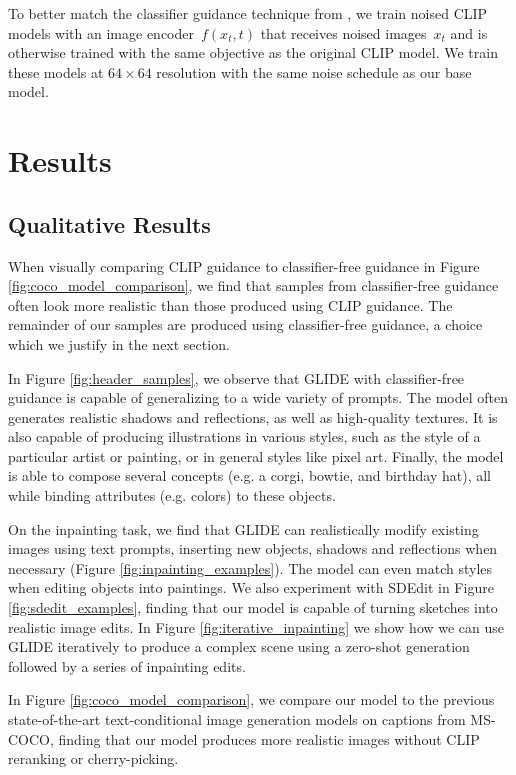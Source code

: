 \documentclass{article}
\newcommand{\modelname}{GLIDE}
\begin{document}
To better match the classifier guidance technique from \citet{sotapaper}, we train noised CLIP models with an image encoder~$f(x_t, t)$ that receives noised images~$x_t$ and is otherwise trained with the same objective as the original CLIP model. We train these models at $64 \times 64$ resolution with the same noise schedule as our base model.


\section{Results}
\label{sec:results}

\subsection{Qualitative Results}
\label{sec:qualitative_results}

When visually comparing CLIP guidance to classifier-free guidance in Figure \ref{fig:coco_model_comparison}, we find that samples from classifier-free guidance often look more realistic than those produced using CLIP guidance. The remainder of our samples are produced using classifier-free guidance, a choice which we justify in the next section.

In Figure \ref{fig:header_samples}, we observe that \modelname{} with classifier-free guidance is capable of generalizing to a wide variety of prompts. The model often generates realistic shadows and reflections, as well as high-quality textures. It is also capable of producing illustrations in various styles, such as the style of a particular artist or painting, or in general styles like pixel art. Finally, the model is able to compose several concepts (e.g. a corgi, bowtie, and birthday hat), all while binding attributes (e.g. colors) to these objects.

On the inpainting task, we find that \modelname{} can realistically modify existing images using text prompts, inserting new objects, shadows and reflections when necessary (Figure \ref{fig:inpainting_examples}). The model can even match styles when editing objects into paintings. We also experiment with SDEdit \mbox{\citep{sdedit}} in Figure \ref{fig:sdedit_examples}, finding that our model is capable of turning sketches into realistic image edits. In Figure \ref{fig:iterative_inpainting} we show how we can use \modelname{} iteratively to produce a complex scene using a zero-shot generation followed by a series of inpainting edits.
 
In Figure \ref{fig:coco_model_comparison}, we compare our model to the previous state-of-the-art text-conditional image generation models on captions from MS-COCO, finding that our model produces more realistic images without CLIP reranking or cherry-picking.
\end{document}
